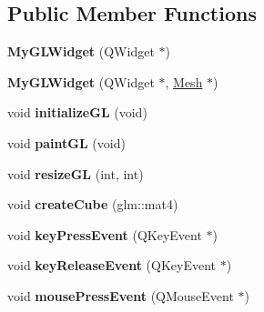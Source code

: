 \subsection*{Public Member Functions}
\begin{DoxyCompactItemize}
\item 
\hypertarget{class_my_g_l_widget_a68a1533b381f3f0ce10990a5c1c5373d}{{\bfseries My\-G\-L\-Widget} (Q\-Widget $\ast$)}\label{class_my_g_l_widget_a68a1533b381f3f0ce10990a5c1c5373d}

\item 
\hypertarget{class_my_g_l_widget_ae4c40fe45c20b478b6d7843240e51534}{{\bfseries My\-G\-L\-Widget} (Q\-Widget $\ast$, \hyperlink{class_mesh}{Mesh} $\ast$)}\label{class_my_g_l_widget_ae4c40fe45c20b478b6d7843240e51534}

\item 
\hypertarget{class_my_g_l_widget_a67f749e14e59cefc456f07342406914c}{void {\bfseries initialize\-G\-L} (void)}\label{class_my_g_l_widget_a67f749e14e59cefc456f07342406914c}

\item 
\hypertarget{class_my_g_l_widget_a38d1694b5914ff9095918712ccd2e8b8}{void {\bfseries paint\-G\-L} (void)}\label{class_my_g_l_widget_a38d1694b5914ff9095918712ccd2e8b8}

\item 
\hypertarget{class_my_g_l_widget_a2b1422168e847ae7589f4a3bcc6e60f1}{void {\bfseries resize\-G\-L} (int, int)}\label{class_my_g_l_widget_a2b1422168e847ae7589f4a3bcc6e60f1}

\item 
\hypertarget{class_my_g_l_widget_a5efd73be2606f800516a15f737131cbb}{void {\bfseries create\-Cube} (glm\-::mat4)}\label{class_my_g_l_widget_a5efd73be2606f800516a15f737131cbb}

\item 
\hypertarget{class_my_g_l_widget_abb8eb0ad77ae3e49b96e85dafa1f1f30}{void {\bfseries key\-Press\-Event} (Q\-Key\-Event $\ast$)}\label{class_my_g_l_widget_abb8eb0ad77ae3e49b96e85dafa1f1f30}

\item 
\hypertarget{class_my_g_l_widget_aed44157f3b13c528f737572882ad6285}{void {\bfseries key\-Release\-Event} (Q\-Key\-Event $\ast$)}\label{class_my_g_l_widget_aed44157f3b13c528f737572882ad6285}

\item 
\hypertarget{class_my_g_l_widget_a98f0ba932652fe25ae3a469a9b6ee7e5}{void {\bfseries mouse\-Press\-Event} (Q\-Mouse\-Event $\ast$)}\label{class_my_g_l_widget_a98f0ba932652fe25ae3a469a9b6ee7e5}


\end{DoxyCompactItemize}
